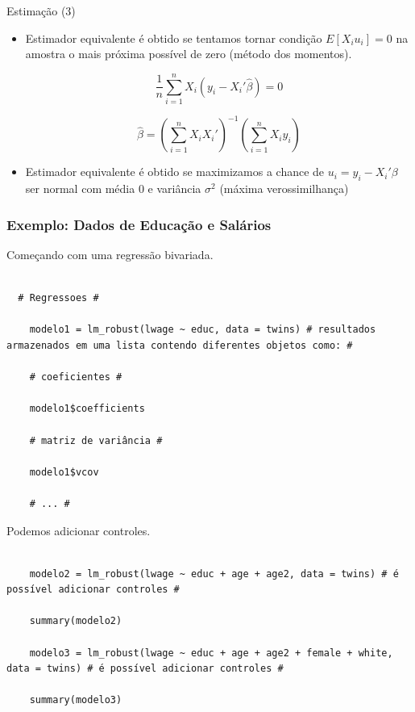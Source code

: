 \documentclass[10pt,slides,xcolor=pdftex,dvipsnames,table]{beamer}
\begin{document}
    
\begin{frame}{Estimação (3)}
    
     \begin{itemize}\itemsep1.2em   
     
     \item Estimador equivalente é obtido se tentamos tornar condição $E[X_i u_i] = 0$ na amostra o mais próxima possível de zero (método dos momentos).
     
     $$ \frac{1}{n} \sum_{i=1}^n X_i (y_i-X_i' \hat{\beta}) = 0 $$
     
     $$ \hat{\beta} = \left( \sum_{i=1}^n X_i X_i' \right)^{-1} \left( \sum_{i=1}^n  X_i y_i \right) $$
     
     \item Estimador equivalente é obtido se maximizamos a chance de $u_i = y_i - X_i' \beta$ ser normal com média $0$ e variância $\sigma^2$ (máxima verossimilhança) 
     
    \end{itemize}
    
\end{frame}


\begin{frame}[fragile]
	\frametitle{Exemplo: Dados de Educação e Salários}

\vspace{0.5cm}
Começando com uma regressão bivariada.

\begin{lstlisting}

  # Regressoes #
    
    modelo1 = lm_robust(lwage ~ educ, data = twins) # resultados armazenados em uma lista contendo diferentes objetos como: #

    # coeficientes #
    
    modelo1$coefficients 
    
    # matriz de variância #
    
    modelo1$vcov
  
    # ... #

\end{lstlisting}

Podemos adicionar controles.

\begin{lstlisting}

    modelo2 = lm_robust(lwage ~ educ + age + age2, data = twins) # é possível adicionar controles #
    
    summary(modelo2)
    
    modelo3 = lm_robust(lwage ~ educ + age + age2 + female + white, data = twins) # é possível adicionar controles #
    
    summary(modelo3)

\end{lstlisting}

\end{frame}
\end{document}
